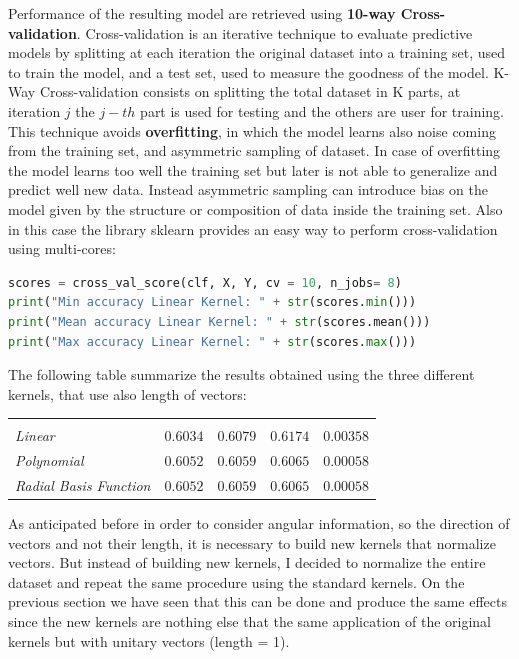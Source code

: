 \documentclass[11pt,a4paper]{article}
\begin{document}
Performance of the resulting model are retrieved using \textbf{10-way Cross-validation}. Cross-validation is an iterative technique to evaluate predictive models by splitting at each iteration the original dataset into a training set, used to train the model, and a test set, used to measure the goodness of the model. K-Way Cross-validation consists on splitting the total dataset in K parts, at iteration $j$ the $j-th$ part is used for testing and the others are user for training. This technique avoids \textbf{overfitting}, in which the model learns also noise coming from the training set, and asymmetric sampling of dataset. In case of overfitting the model learns too well the training set but later is not able to generalize and predict well new data. Instead asymmetric sampling can introduce bias on the model given by the structure or composition of data inside the training set.
Also in this case the library sklearn provides an easy way to perform cross-validation using multi-cores:

\begin{lstlisting}[language=Python]
scores = cross_val_score(clf, X, Y, cv = 10, n_jobs= 8)
print("Min accuracy Linear Kernel: " + str(scores.min()))
print("Mean accuracy Linear Kernel: " + str(scores.mean()))
print("Max accuracy Linear Kernel: " + str(scores.max()))
\end{lstlisting}
The following table summarize the results obtained using the three different kernels, that use also length of vectors:
\begin{table}[!htbp]
	\begin{tabularx}{\linewidth}{|Y|l|l|l|l|}
		 &  &  &  &   \\
		\centering \textit{Linear} & $0.6034$ & $0.6079$ & $0.6174$ &   $0.00358$\\
		
		\centering \textit{Polynomial} & $0.6052$ & $0.6059$ & $0.6065$ & $0.00058$\\

		\centering \textit{Radial Basis Function} & $0.6052$ & $0.6059$ & $0.6065$ & $0.00058$\\
	\end{tabularx}
\end{table}

As anticipated before in order to consider angular information, so the direction of vectors and not their length, it is necessary to build new kernels that normalize vectors. But instead of building new kernels, I decided to normalize the entire dataset and repeat the same procedure using the standard kernels. On the previous section we have seen that this can be done and produce the same effects since the new kernels are nothing else that the same application of the original kernels but with unitary vectors (length = 1). \\
\end{document}
